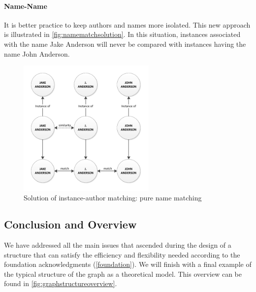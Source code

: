 \paragraph{Name-Name} It is better practice to keep authors and names more isolated. This new approach is illustrated in \autoref{fig:namematchsolution}. In this situation, instances associated with the name Jake Anderson will never be compared with instances having the name John Anderson.

\begin{figure}[htb]
	\centering
		\includegraphics[width=0.6\textwidth]{fig/namematchsolution}
	\caption{Solution of instance-author matching: pure name matching}
	\label{fig:namematchsolution}
\end{figure}

\subsection{Conclusion and Overview}
	
We have addressed all the main issues that ascended during the design of a structure that can satisfy the efficiency and flexibility needed according to the foundation acknowledgments (\autoref{foundation}). We will finish with a final example of the typical structure of the graph as a theoretical model. This overview can be found in \autoref{fig:graphstructureoverview}.

